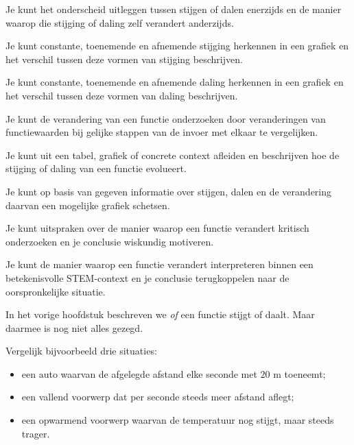 \documentclass{ximera}
\begin{document}
  \begin{leerdoelen}
  
    \item Je kunt het onderscheid uitleggen tussen stijgen of dalen enerzijds en de manier waarop die stijging of daling zelf verandert anderzijds.
  
    \item Je kunt constante, toenemende en afnemende stijging herkennen in een grafiek en het verschil tussen deze vormen van stijging beschrijven.
  
    \item Je kunt constante, toenemende en afnemende daling herkennen in een grafiek en het verschil tussen deze vormen van daling beschrijven.
  
    \item Je kunt de verandering van een functie onderzoeken door veranderingen van functiewaarden bij gelijke stappen van de invoer met elkaar te vergelijken.
  
    \item Je kunt uit een tabel, grafiek of concrete context afleiden en beschrijven hoe de stijging of daling van een functie evolueert.
  
    \item Je kunt op basis van gegeven informatie over stijgen, dalen en de verandering daarvan een mogelijke grafiek schetsen.
  
    \item Je kunt uitspraken over de manier waarop een functie verandert kritisch onderzoeken en je conclusie wiskundig motiveren.
  
    \item Je kunt de manier waarop een functie verandert interpreteren binnen een betekenisvolle STEM-context en je conclusie terugkoppelen naar de oorspronkelijke situatie.
  
  \end{leerdoelen}




In het vorige hoofdstuk beschreven we \emph{of} een functie stijgt of daalt.
Maar daarmee is nog niet alles gezegd.

Vergelijk bijvoorbeeld drie situaties:

\begin{itemize}
  \item een auto waarvan de afgelegde afstand elke seconde met \(20\) m toeneemt;
  \item een vallend voorwerp dat per seconde steeds meer afstand aflegt;
  \item een opwarmend voorwerp waarvan de temperatuur nog stijgt, maar steeds trager.
\end{itemize}
\end{document}
